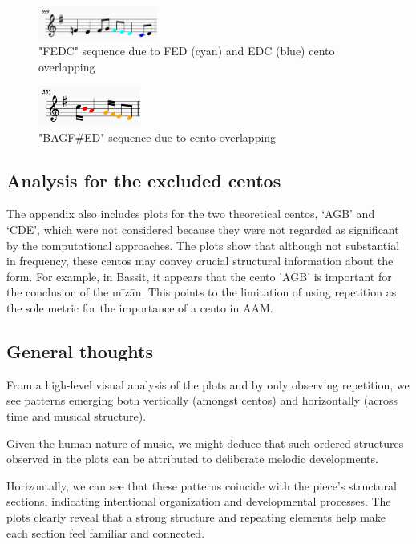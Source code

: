 \documentclass{article}
\begin{document}
\begin{figure}[h]
    \centering
    \includegraphics[width=0.35\textwidth]{paper/figs/cento_overlap_1.png}
    \caption{"FEDC" sequence due to FED (cyan) and EDC (blue) cento overlapping}
    \label{fig:cento_overlap_1}
\end{figure}

\begin{figure}[h]
    \centering
    \includegraphics[width=0.3\textwidth]{paper/figs/cento_overlap_2.png}
    \caption{"BAGF\#ED" sequence due to cento overlapping}
    \label{fig:cento_overlap_2}
\end{figure}

\subsection{Analysis for the excluded centos}

The appendix also includes plots for the two theoretical centos, ‘AGB’ and ‘CDE’, which were not considered because they were not regarded as significant by the computational approaches. The plots show that although not substantial in frequency, these centos may convey crucial structural information about the form. For example, in Bassit, it appears that the cento 'AGB' is important for the conclusion of the mīzān. This points to the limitation of using repetition as the sole metric for the importance of a cento in AAM.

\subsection{General thoughts}

From a high-level visual analysis of the plots and by only observing repetition, we see patterns emerging both vertically (amongst centos) and horizontally (across time and musical structure).

Given the human nature of music, we might deduce that such ordered structures observed in the plots can be attributed to deliberate melodic developments.

Horizontally, we can see that these patterns coincide with the piece's structural sections, indicating intentional organization and developmental processes. The plots clearly reveal that a strong structure and repeating elements help make each section feel familiar and connected.
\end{document}
